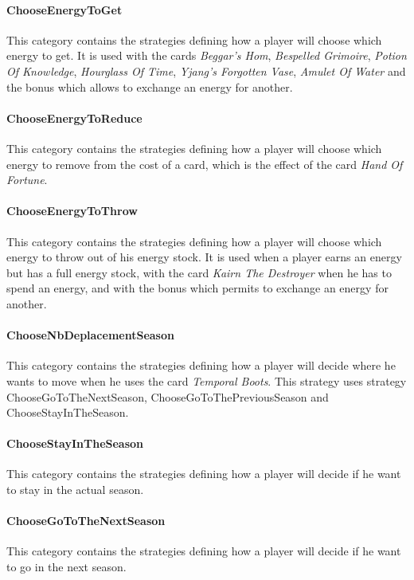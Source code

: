         \paragraph{ChooseEnergyToGet}
        This category contains the strategies defining how a player will choose which energy to get. It is used with the cards \textit{Beggar's Hom}, \textit{Bespelled Grimoire}, \textit{Potion Of Knowledge}, \textit{Hourglass Of Time}, \textit{Yjang's Forgotten Vase}, \textit{Amulet Of Water} and the bonus which allows to exchange an energy for another.
        
        \paragraph{ChooseEnergyToReduce}
        This category contains the strategies defining how a player will choose which energy to remove from the cost of a card, which is the effect of the card \textit{Hand Of Fortune}.
        
        \paragraph{ChooseEnergyToThrow}
        This category contains the strategies defining how a player will choose which energy to throw out of his energy stock. It is used when a player earns an energy but has a full energy stock, with the card \textit{Kairn The Destroyer} when he has to spend an energy, and with the bonus which permits to exchange an energy for another.
        
        \paragraph{ChooseNbDeplacementSeason}
        This category contains the strategies defining how a player will decide where he wants to move when he uses the card \textit{Temporal Boots}. This strategy uses strategy ChooseGoToTheNextSeason, ChooseGoToThePreviousSeason and ChooseStayInTheSeason.
        
        \paragraph{ChooseStayInTheSeason}
        This category contains the strategies defining how a player will decide if he want to stay in the actual season.
        
        \paragraph{ChooseGoToTheNextSeason}
        This category contains the strategies defining how a player will decide if he want to go in the next season.     
        
